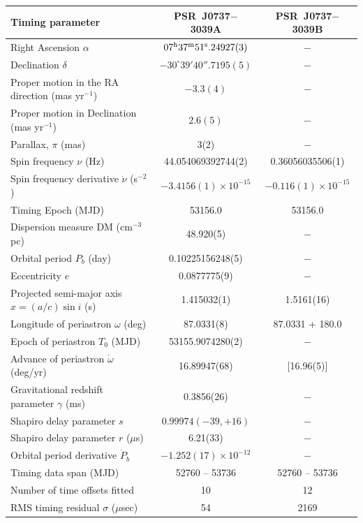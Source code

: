 \documentclass[12pt,psfig]{article}
\begin{document}
\begin{table}[ht]
\begin{center}
\begin{scriptsize}
\begin{tabular}{lcc}
\hline
Timing parameter & PSR~J0737$-$3039A & PSR~J0737$-$3039B \\ \hline
Right Ascension $\alpha$  & $07^{\rm{h}}37^{\rm{m}}51^{\rm{s}}.24927(3)$ & $-$ \\
Declination $\delta$  & $-30^\circ 39' 40''.7195(5)$ & $-$ \\
Proper motion in the RA direction (mas yr$^{-1}$) & $-3.3(4)$ & $-$ \\
Proper motion in Declination (mas yr$^{-1}$) & $2.6(5)$ & $-$ \\
Parallax, $\pi$ (mas) & 3(2) & $-$ \\
Spin frequency $\nu$ (Hz) & 44.054069392744(2) &  0.36056035506(1) \\
Spin frequency derivative $\dot\nu$ (s$^{-2}$) & $-3.4156(1) \times 10^{-15}$ &
$-0.116(1)\times 10^{-15}$ \\
Timing Epoch (MJD) & 53156.0 & 53156.0 \\
Dispersion measure DM (cm$^{-3}$pc) & 48.920(5) &  $-$\\
Orbital period $P_b$ (day) & 0.10225156248(5) & $-$ \\
Eccentricity $e$ & 0.0877775(9) & $-$ \\
Projected semi-major axis $x=(a/c)\sin i$ (s) & 1.415032(1) & 
1.5161(16) \\
Longitude of periastron $\omega$ (deg) & 87.0331(8) & 87.0331 + 180.0 \\
Epoch of periastron $T_0$ (MJD) & 53155.9074280(2) & $-$ \\
Advance of periastron $\dot\omega$ (deg/yr) & 16.89947(68) & [16.96(5)] \\
Gravitational redshift parameter $\gamma$ (ms) & 0.3856(26) & $-$ \\
Shapiro delay parameter $s$ & $0.99974(-39,+16)$ & $-$ \\
Shapiro delay parameter $r$ ($\mu$s) & 6.21(33) & $-$ \\
Orbital period derivative $\dot P_b$ & $-1.252(17)\times 10^{-12}$ &$-$ \\ \hline
Timing data span (MJD) & 52760 -- 53736 & 52760 -- 53736 \\
Number of time offsets fitted & 10 & 12 \\ 
RMS timing residual $\sigma$ ($\mu$sec) & 54 & 2169 \\

\end{tabular}
\end{scriptsize}
\end{center}
\end{table}
\end{document}
